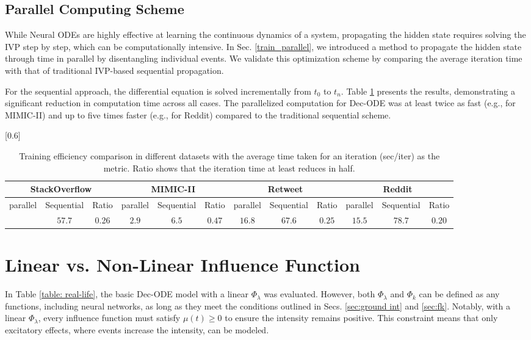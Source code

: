 \subsection{Parallel Computing Scheme \label{ablation: parallel}}
While Neural ODEs are highly effective at learning the continuous dynamics of a system, propagating the hidden state requires solving the IVP step by step, which can be computationally intensive.  
In Sec. \ref{train_parallel}, we introduced a method to propagate the hidden state through time in parallel by disentangling individual events.  
We validate this optimization scheme by comparing the average iteration time with that of traditional IVP-based sequential propagation.  

For the sequential approach, the differential equation is solved incrementally from $t_0$ to $t_n$.  
Table \ref{tab:parallel} presents the results, demonstrating a significant reduction in computation time across all cases.  
The parallelized computation for Dec-ODE was at least twice as fast (e.g., for MIMIC-II) and up to five times faster (e.g., for Reddit) compared to the traditional sequential scheme.

\begin{table}[h]
\renewcommand{\arraystretch}{1.1}
\centering
\caption{Training efficiency comparison in different datasets with the average time taken for an iteration (sec/iter) as the metric. Ratio shows that the iteration time at least reduces in half.}
\scalebox{0.6}[0.6]{
\begin{tabular}{cc |c| cc|c | c c|c | cc|c } 
\multicolumn{3}{c|}{StackOverflow} & \multicolumn{3}{c|}{MIMIC-II} & \multicolumn{3}{c|}{Retweet} & \multicolumn{3}{c}{Reddit}\\[-2pt]
\hline
parallel &Sequential& Ratio &  parallel& Sequential&Ratio &  parallel&Sequential&Ratio &  parallel&Sequential&Ratio\\
\hline
\multirow{1}{*}{} $15.0$ & $57.7$ &0.26 & $2.9$ & $6.5$ & $0.47$ & $16.8$ & $67.6$ &$0.25$ & $15.5$ & $78.7$ & $0.20$ \\
   
\end{tabular}
}
\label{tab:parallel}
\end{table}


\section{Linear vs. Non-Linear Influence Function\label{lin-nonlin}}  
In Table \ref{table: real-life}, the basic Dec-ODE model with a linear $\Phi_\lambda$ was evaluated.  
However, both $\Phi_\lambda$ and $\Phi_k$ can be defined as any functions, including neural networks, as long as they meet the conditions outlined in Secs. \ref{sec:ground int} and \ref{sec:fk}.  
Notably, with a linear $\Phi_\lambda$, every influence function must satisfy $\mu(t) \ge 0$ to ensure the intensity remains positive.  
This constraint means that only excitatory effects, where events increase the intensity, can be modeled.  

